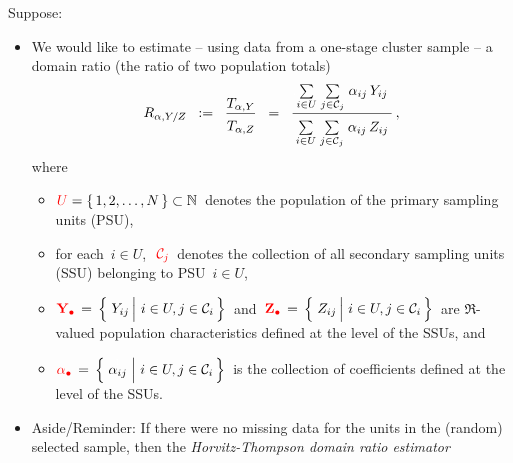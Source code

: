 Suppose:
\begin{itemize}
\item
    We would like to estimate
    -- using data from a one-stage cluster sample --
    a domain ratio (the ratio of two population totals)
    \begin{equation*}
    R_{\alpha,Y/Z}
    \;\; := \;\;
        \dfrac{T_{\alpha,Y}}{\overset{{\color{white}.}}{T_{\alpha,Z}}}
    \;\; = \;\;
        \dfrac{
            {\color{white}.}
            \underset{i \in U}{\sum}\;
            \underset{j \in \mathcal{C}_{j}}{\sum}\;
            \alpha_{ij}\,Y_{ij}
            {\color{white}.}
            }{
            \overset{{\color{white}.}}{
                \underset{i \in U}{\sum}\;
                \underset{j \in \mathcal{C}_{j}}{\sum}\;
                \alpha_{ij}\,Z_{ij}
                }
            }\,,
    \end{equation*}
    where
    \begin{itemize}
    \item
        ${\color{red}U} = \{\,1,2,\ldots,N\,\} \subset \mathbb{N}$\,
        denotes the population of the primary sampling units (PSU),
    \item
        for each \,$i \in U$,\,
        \,${\color{red}\mathcal{C}_{j}}$\,
        denotes the collection of all secondary sampling units (SSU) belonging to PSU \,$i \in U$,
    \item
        $
        {\color{red}\Ydot} \, = \, \left\{\,
            \left.
            \overset{{\color{white}.}}{Y_{ij}}
            \,\right\vert\,
            i \in U, j \in \mathcal{C}_{i}
            \,\right\}
        $\,
        and
        \,$
        {\color{red}\Zdot} \, = \, \left\{\,
            \left.
            \overset{{\color{white}.}}{Z_{ij}}
            \,\right\vert\,
            i \in U, j \in \mathcal{C}_{i}
            \,\right\}
        $\,
        are $\Re$-valued population characteristics defined at the level of the SSUs, and
    \item
        $
        {\color{red}\abullet} \, = \, \left\{\,
            \left.
            \overset{{\color{white}1}}{\alpha_{ij}}
            \;\right\vert\,
            i \in U, j \in \mathcal{C}_{i}
            \,\right\}
        $\,
        is the collection of coefficients defined at the level of the SSUs.
    \end{itemize}
\item
    Aside/Reminder:
    If there were no missing data for the units in the (random) selected sample,
    then the \textit{Horvitz-Thompson domain ratio estimator}

\end{itemize}
